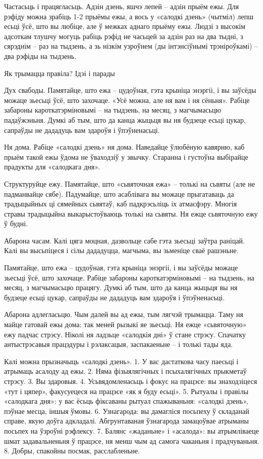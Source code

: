 Частасьць і працягласьць.
Адзін дзень, яшчэ лепей – адзін прыём ежы. Для рэфіду можна зрабіць 1-2 прыёмы ежы, а вось у «салодкі дзень» (чытміл) лепш есьці ўсё, што вы любіце, але ў межках аднаго прыёму ежы. Людзі з высокім адсоткам тлушчу могуць рабіць рэфід не часьцей за адзін раз на два тыдні, з сярэднім – раз на тыдзень, а зь нізкім узроўнем (ды інтэнсіўнымі трэніроўкамі) – два рэфіды на тыдзень.

Як трымацца правіла? Ідэі і парады

Дух свабоды.
Памятайце, што ежа – цудоўная, гэта крыніца энэргіі, і вы заўсёды можаце зьесьці ўсё, што захочаце. «Усё можна, але ня вам і ня сёньня». Рабіце забароны кароткатэрміновымі – на тыдзень, на месяц, з магчымасьцю падаўжэньня. Думкі аб тым, што да канца жыцьця вы ня будзеце есьці цукар, сапраўды не дададуць вам здароўя і ўпэўненасьці.

Ня дома.
Рабіце «салодкі дзень» ня дома. Наведайце ўлюбёную кавярню, каб прыём такой ежы ўдома не ўваходзіў у звычку. Старанна і густоўна выбірайце прадукты для «салодкага дня».

Структуруйце ежу.
Памятайце, што «сьвяточная ежа» – толькі на сьвяты (але не падманвайце сябе). Падумайце, што асаблівага вы можаце прыгатаваць да традыцыйных ці сямейных сьвятаў, каб падкрэсьліць іх атмасфэру. Многія стравы традыцыйна выкарыстоўваюць толькі на сьвяты. Ня ежце сьвяточную ежу ў будні.

Абарона часам.
Калі цяга моцная, дазвольце сабе гэта зьесьці заўтра раніцай. Калі вы высьпіцеся і сілы дададуцца, магчыма, вы зьменіце сваё рашэньне.

Памятайце, што ежа – цудоўная, гэта крыніца энэргіі, і вы заўсёды можаце зьесьці ўсё, што захочаце. Рабіце забароны кароткатэрміновымі – на тыдзень, на месяц, з магчымасьцю працягу. Думкі аб тым, што да канца жыцьця вы ня будзеце есьці цукар, сапраўды не дададуць вам здароўя і ўпэўненасьці.

Абарона адлегласьцю.
Чым далей вы ад ежы, тым лягчэй трымацца. Таму ня майце гатовай ежы дома: так меней рызыкі яе зьесьці.
Ня ежце «сьвяточную» ежу падчас стрэсу.
Ніколі ня ладзьце «салодкія дні» ў стане стрэсу. Спачатку антыстрэсавыя працэдуры і рэлаксацыя, заспакаеньне – і толькі тады яда.

Калі можна прызначыць «салодкі дзень».
1. У вас дастаткова часу паесьці і атрымаць асалоду ад ежы.
2. Няма фізыялягічных і псыхалягічных прыкметаў стрэсу.
3. Вы здаровыя.
4. Усьвядомленасьць і фокус на працэсе: вы знаходзіцеся «тут і цяпер», факусуецеся на працэсе «як я буду есьці».
5. Рытуалы і правілы «салодкага дня»: у вас ёсьць фіксаваны рытуал спажываньня: «салодкі дзень», пэўнае месца, іншыя ўмовы.
6. Узнагарода: вы дамагліся посьпеху ў складанай справе, якую доўга адкладалі. Абгрунтаваная ўзнагарода замацоўвае атрыманы посьпех на ўзроўні рэфлексу.
7. Балянс «жаданьне» і «асалода»: вы атрымліваеце шмат задавальненьня ў працэсе, ня менш чым ад самога чаканьня і прадчуваньня.
8. Добры, спакойны посмак, расслабленьне.

